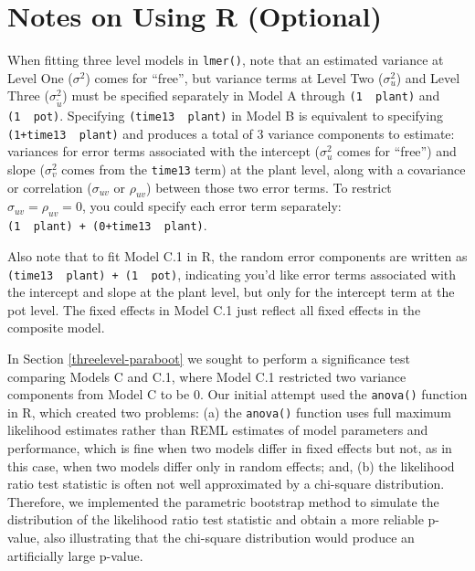 \documentclass[
]{krantz}
\begin{document}
\hypertarget{usingR3}{%
\section{Notes on Using R (Optional)}\label{usingR3}}

When fitting three level models in \texttt{lmer()}, note that an estimated variance at Level One (\(\sigma^{2}\)) comes for ``free'', but variance terms at Level Two (\(\sigma_{u}^{2}\)) and Level Three (\(\sigma_{\tilde{u}}^{2}\)) must be specified separately in Model A through \texttt{(1\ \textbar{}\ plant)} and \texttt{(1\ \textbar{}\ pot)}. Specifying \texttt{(time13\ \textbar{}\ plant)} in Model B is equivalent to specifying \texttt{(1+time13\ \textbar{}\ plant)} and produces a total of 3 variance components to estimate: variances for error terms associated with the intercept (\(\sigma_{u}^{2}\) comes for ``free'') and slope (\(\sigma_{v}^{2}\) comes from the \texttt{time13} term) at the plant level, along with a covariance or correlation (\(\sigma_{uv}\) or \(\rho_{uv}\)) between those two error terms. To restrict \(\sigma_{uv} = \rho_{uv} = 0\), you could specify each error term separately: \texttt{(1\ \textbar{}\ plant)\ +\ (0+time13\ \textbar{}\ plant)}.

Also note that to fit Model C.1 in R, the random error components are written as \texttt{(time13\ \textbar{}\ plant)\ +\ (1\ \textbar{}\ pot)}, indicating you'd like error terms associated with the intercept and slope at the plant level, but only for the intercept term at the pot level. The fixed effects in Model C.1 just reflect all fixed effects in the composite model.

In Section \ref{threelevel-paraboot} we sought to perform a significance test comparing Models C and C.1, where Model C.1 restricted two variance components from Model C to be 0. Our initial attempt used the \texttt{anova()} function in R, which created two problems: (a) the \texttt{anova()} function uses full maximum likelihood estimates rather than REML estimates of model parameters and performance, which is fine when two models differ in fixed effects but not, as in this case, when two models differ only in random effects; and, (b) the likelihood ratio test statistic is often not well approximated by a chi-square distribution. Therefore, we implemented the parametric bootstrap method to simulate the distribution of the likelihood ratio test statistic and obtain a more reliable p-value, also illustrating that the chi-square distribution would produce an artificially large p-value.
\end{document}
